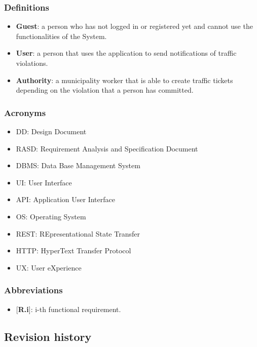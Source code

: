     \subsubsection{Definitions}
        \begin{itemize}
            \item \textbf{Guest}: a person who has not logged in or registered yet and cannot use the functionalities of the System.
            \item \textbf{User}: a person that uses the application to send notifications of traffic violations.
            \item \textbf{Authority}: a municipality worker that is able to create traffic tickets depending on the violation that a person has committed.
        \end{itemize}
        
    \subsubsection{Acronyms}
    \begin{itemize}
        \item DD: Design Document
        \item RASD: Requirement Analysis and Specification Document
        \item DBMS: Data Base Management System
        \item UI: User Interface
        \item API: Application User Interface
        \item OS: Operating System
        \item REST: REpresentational State Transfer
        \item HTTP: HyperText Transfer Protocol 
        \item UX: User eXperience
    \end{itemize}
    \subsubsection{Abbreviations}
        \begin{itemize}
            \item {[\textbf{R.i}]}: i-th functional requirement.
        \end{itemize}

\subsection{Revision history}




